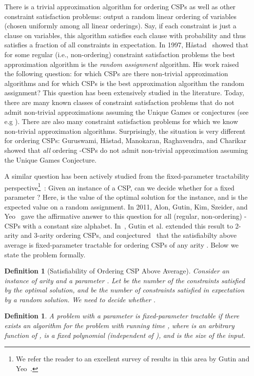 \documentclass[11pt]{article}
\newtheorem{definition}[theorem]{Definition}
\begin{document}
There is a trivial approximation algorithm for ordering CSPs as well as other constraint satisfaction problems: output a random linear ordering of variables  (chosen uniformly among all  linear orderings). Say, if each constraint is just a clause on  variables, this algorithm satisfies each clause with probability  and thus satisfies a  fraction of all constraints in expectation.
In 1997, H\aa{}stad~\cite{Hastad} showed that for some regular (i.e., non-ordering) constraint satisfaction problems the best approximation algorithm is the \textit{random assignment} algorithm. His work raised
the following question: for which CSPs are there non-trivial approximation algorithms and
for which CSPs is the best approximation algorithm the random assignment?
This question has been extensively studied in the literature. Today, there are
many known classes of constraint satisfaction problems that do not admit non-trivial approximations
assuming the Unique Games or  conjectures (see e.g \cite{Hastad, AM, GR, Chan}).
There are also many constraint satisfaction problems for which we know non-trivial approximation algorithms.
Surprisingly, the situation is very different for ordering CSPs:
Guruswami, H\aa{}stad,
Manokaran, Raghavendra, and Charikar~\cite{GHMRC} showed that
\textit{all} ordering -CSPs do not admit non-trivial approximation assuming the Unique Games Conjecture.

A similar question has been actively studied from the fixed-parameter tractability
perspective\footnote{We refer the reader to an excellent survey of results in this area by Gutin and Yeo~\cite{GY}.}~\cite{AGKSY, CFGJRTY, CGJRS,GKSY,KW,MR,RS}: Given an instance of a CSP, can we decide whether
 for a fixed parameter ? Here,  is the value of the optimal solution for the instance,
and  is the expected value on a  random assignment.
In 2011, Alon, Gutin, Kim, Szeider, and Yeo~\cite{AGKSY} gave the affirmative answer to this question for all (regular, non-ordering) -CSPs
with a constant size alphabet. In~\cite{GKSY, GIMY, GKMY}, Gutin et al. extended this result to
2-arity and 3-arity ordering CSPs, and conjectured~\cite{GIMY} that the satisfiabilty above average is fixed-parameter tractable for ordering CSPs of any arity .
Below we state the problem formally.

\begin{definition}[Satisfiability of Ordering CSP Above Average]\label{def:above-avg}
Consider an instance  of arity  and a parameter . Let  be the number of the constraints satisfied by the optimal solution, and
 be the number of constraints satisfied in expectation by a random solution. We need to decide whether .
\end{definition}
\begin{definition}
A problem with a parameter  is fixed-parameter tractable	if there exists an
algorithm for the problem with running time , where  is an arbitrary function of ,  is a fixed polynomial (independent of ),
and  is the size of the input.
\end{definition}
\end{document}
